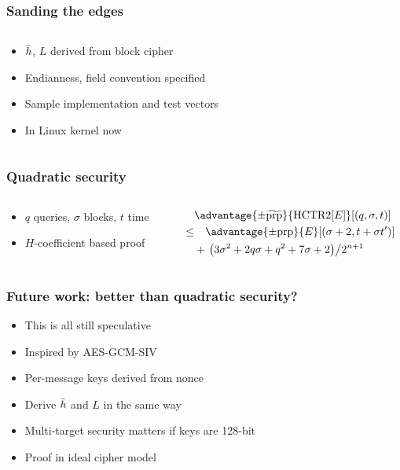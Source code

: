 \documentclass[aspectratio=169]{beamer}
\newenvironment*{figslide}{
    \begin{columns}
        \begin{column}{.4\textwidth}

}{
\end{column}
\begin{column}{.6\textwidth}
    \begin{figure}
        
    \end{figure}
\end{column}
\end{columns}
}
\begin{document}
\begin{frame}

\frametitle{Sanding the edges}
\begin{figslide}
    \begin{itemize}
        \item \(\bar{h}\), \(L\) derived from block cipher
        \item Endianness, field convention specified
        \item Sample implementation and test vectors
        \item In Linux kernel now
    \end{itemize}

\end{figslide}
\end{frame}

\begin{frame}

    \frametitle{Quadratic security}

    \begin{columns}
        \begin{column}{.4\textwidth}
            \begin{itemize}
                \item \(q\) queries, \(\sigma\) blocks, \(t\) time
                \item \(H\)-coefficient based proof
            \end{itemize}
                \end{column}
        \begin{column}{.6\textwidth}
            \begin{align*}
                &\advantage{\pm \widetilde{\mathrm{prp}}}{\HCTR[E]}[(q, \sigma, t)] \\
                \leq & \quad \advantage{\pm \mathrm{prp}}{E}[(\sigma + 2, t + \sigma t')] \\
                &+ \left.\left(3\sigma^2 + 2q\sigma + q^2 + 7\sigma + 2\right)\middle/2^{n+1}\right.
            \end{align*}
                \end{column}
    \end{columns}
\end{frame}
    
\begin{frame}
\frametitle{Future work: better than quadratic security?}

\begin{itemize}
    \item This is all still speculative
    \item Inspired by AES-GCM-SIV
    \item Per-message keys derived from nonce
    \item Derive \(\bar{h}\) and \(L\) in the same way
    \item Multi-target security matters if keys are 128-bit
    \item Proof in ideal cipher model
\end{itemize}
\end{frame}
\end{document}
